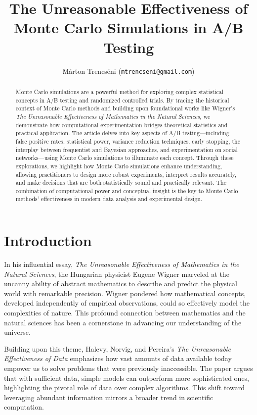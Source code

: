 \documentclass[final,5p,times,twocolumn,authoryear]{elsarticle}
\begin{document}
\begin{frontmatter}

\title{The Unreasonable Effectiveness of Monte Carlo Simulations in A/B Testing}

\author{Márton Trencséni (\texttt{mtrencseni@gmail.com})}

\begin{abstract}
Monte Carlo simulations are a powerful method for exploring complex statistical concepts in A/B testing and randomized controlled trials. By tracing the historical context of Monte Carlo methods and building upon foundational works like Wigner's \textit{The Unreasonable Effectiveness of Mathematics in the Natural Sciences,} we demonstrate how computational experimentation bridges theoretical statistics and practical application. The article delves into key aspects of A/B testing—including false positive rates, statistical power, variance reduction techniques, early stopping, the interplay between frequentist and Bayesian approaches, and experimentation on social networks—using Monte Carlo simulations to illuminate each concept. Through these explorations, we highlight how Monte Carlo simulations enhance understanding, allowing practitioners to design more robust experiments, interpret results accurately, and make decisions that are both statistically sound and practically relevant. The combination of computational power and conceptual insight is the key to Monte Carlo methods' effectiveness in modern data analysis and experimental design. 

\end{abstract}

\end{frontmatter}

\section{Introduction}

In his influential essay, \textit{The Unreasonable Effectiveness of Mathematics in the Natural Sciences}, the Hungarian physicist Eugene Wigner marveled at the uncanny ability of abstract mathematics to describe and predict the physical world with remarkable precision. Wigner pondered how mathematical concepts, developed independently of empirical observations, could so effectively model the complexities of nature. This profound connection between mathematics and the natural sciences has been a cornerstone in advancing our understanding of the universe.

Building upon this theme, Halevy, Norvig, and Pereira's \textit{The Unreasonable Effectiveness of Data} emphasizes how vast amounts of data available today empower us to solve problems that were previously inaccessible. The paper argues that with sufficient data, simple models can outperform more sophisticated ones, highlighting the pivotal role of data over complex algorithms. This shift toward leveraging abundant information mirrors a broader trend in scientific computation.
\end{document}
